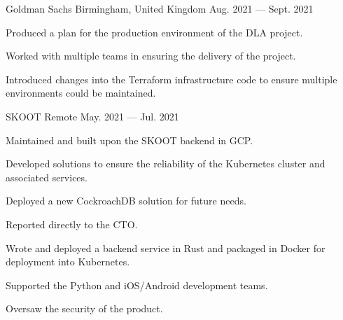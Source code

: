 

\begin{cventries}

    {Goldman Sachs}
    {Birmingham, United Kingdom}
    {Aug. 2021 — Sept. 2021}
    {
        \begin{cvitems}
	    \item{Produced a plan for the production environment of the DLA project.}
            \item{Worked with multiple teams in ensuring the delivery of the project.}
	    \item{Introduced changes into the Terraform infrastructure code to ensure multiple environments could be maintained.}
        \end{cvitems}
    }

    {SKOOT}
    {Remote}
    {May. 2021 — Jul. 2021}
    {
        \begin{cvitems}
            \item{Maintained and built upon the SKOOT backend in GCP.}
            \item{Developed solutions to ensure the reliability of the Kubernetes cluster and associated services.}
	    \item{Deployed a new CockroachDB solution for future needs.}
            \item{Reported directly to the CTO.}
            \item{Wrote and deployed a backend service in Rust and packaged in Docker for deployment into Kubernetes.}
            \item{Supported the Python and iOS/Android development teams.}
            \item{Oversaw the security of the product.}
        \end{cvitems}
    }


\end{cventries}
